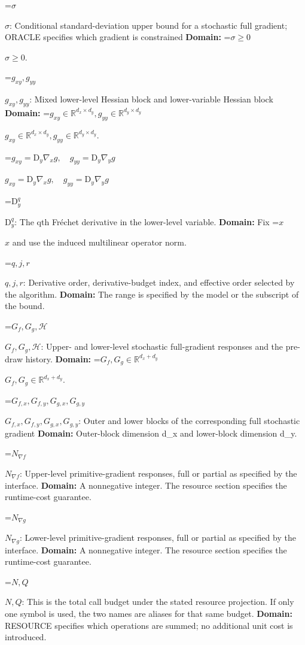 \documentclass[10pt,a4paper]{article}
\newcommand{\AtlasMath}[1]{\par\begingroup\centering\setbox0=\hbox{$\displaystyle #1$}\ifdim\wd0>1.4\linewidth\typeout{ATLAS WIDE FORMULA: \the\wd0}\fi\ifdim\wd0>\linewidth\resizebox{\linewidth}{!}{\box0}\else\box0\fi\par\endgroup}
\newcommand{\AtlasInlineMath}[1]{\begingroup\setbox0=\hbox{$#1$}\ifdim\wd0>.4\linewidth\endgroup\AtlasMath{#1}\else\endgroup$#1$\fi}
\begin{document}
\AtlasInlineMath{\sigma}: Conditional standard-deviation upper bound for a stochastic full gradient; ORACLE specifies which gradient is constrained \textbf{Domain:} \AtlasInlineMath{\sigma\ge0}.

\AtlasInlineMath{g_{xy},g_{yy}}: Mixed lower-level Hessian block and lower-variable Hessian block \textbf{Domain:} \AtlasInlineMath{g_{xy}\in\mathbb R^{d_x\times d_y},g_{yy}\in\mathbb R^{d_y\times d_y}}.

\AtlasInlineMath{g_{xy}=\mathrm D_y\nabla_xg,\quad g_{yy}=\mathrm D_y\nabla_yg}

\AtlasInlineMath{\mathrm D_y^q}: The qth Fréchet derivative in the lower-level variable. \textbf{Domain:} Fix \AtlasInlineMath{x} and use the induced multilinear operator norm.

\AtlasInlineMath{q,j,r}: Derivative order, derivative-budget index, and effective order selected by the algorithm. \textbf{Domain:} The range is specified by the model or the subscript of the bound.

\AtlasInlineMath{G_f,G_g,\mathcal H}: Upper- and lower-level stochastic full-gradient responses and the pre-draw history. \textbf{Domain:} \AtlasInlineMath{G_f,G_g\in\mathbb R^{d_x+d_y}}.

\AtlasInlineMath{G_{f,x},G_{f,y},G_{g,x},G_{g,y}}: Outer and lower blocks of the corresponding full stochastic gradient \textbf{Domain:} Outer-block dimension d\_x and lower-block dimension d\_y.

\AtlasInlineMath{N_{\nabla f}}: Upper-level primitive-gradient responses, full or partial as specified by the interface. \textbf{Domain:} A nonnegative integer. The resource section specifies the runtime-cost guarantee.

\AtlasInlineMath{N_{\nabla g}}: Lower-level primitive-gradient responses, full or partial as specified by the interface. \textbf{Domain:} A nonnegative integer. The resource section specifies the runtime-cost guarantee.

\AtlasInlineMath{N,Q}: This is the total call budget under the stated resource projection. If only one symbol is used, the two names are aliases for that same budget. \textbf{Domain:} RESOURCE specifies which operations are summed; no additional unit cost is introduced.
\end{document}
